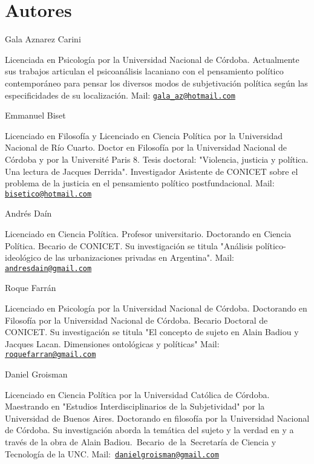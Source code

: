 \documentclass{book}
\begin{document}
\chapter*{Autores}

Gala Aznarez Carini

Licenciada en Psicología por la Universidad Nacional de Córdoba.
Actualmente sus trabajos articulan el psicoanálisis lacaniano con el
pensamiento político contemporáneo para pensar los diversos modos de
subjetivación política según las especificidades de su localización.
Mail:
\href{mailto:gala_az@hotmail.com}{\nolinkurl{gala\_az@hotmail.com}}

Emmanuel Biset

Licenciado en Filosofía y Licenciado en Ciencia Política por la
Universidad Nacional de Río Cuarto. Doctor en Filosofía por la
Universidad Nacional de Córdoba y por la Université Paris 8. Tesis
doctoral: "Violencia, justicia y política. Una lectura de Jacques
Derrida". Investigador Asistente de CONICET sobre el problema de la
justicia en el pensamiento político postfundacional. Mail:
\href{mailto:bisetico@hotmail.com}{\nolinkurl{bisetico@hotmail.com}}

Andrés Daín

Licenciado en Ciencia Política. Profesor universitario. Doctorando en
Ciencia Política. Becario de CONICET. Su investigación se titula
"Análisis político-ideológico de las urbanizaciones privadas en
Argentina". Mail:
\href{mailto:andresdain@gmail.com}{\nolinkurl{andresdain@gmail.com}}

Roque Farrán

Licenciado en Psicología por la Universidad Nacional de Córdoba.
Doctorando en Filosofía por la Universidad Nacional de Córdoba. Becario
Doctoral de CONICET. Su investigación se titula "El concepto de sujeto
en Alain Badiou y Jacques Lacan. Dimensiones ontológicas y políticas"
Mail:
\href{mailto:roquefarran@gmail.com}{\nolinkurl{roquefarran@gmail.com}}

Daniel Groisman

Licenciado en Ciencia Política por la Universidad Católica de Córdoba.
Maestrando en "Estudios Interdisciplinarios de la Subjetividad" por la
Universidad de Buenos Aires. Doctorando en filosofía por la Universidad
Nacional de Córdoba. Su investigación aborda la temática del sujeto y la
verdad en y a través de la obra de Alain Badiou.~Becario~de
la~Secretaría de Ciencia y Tecnología de la UNC.
Mail:~\href{mailto:danielgroisman@gmail.com}{\nolinkurl{danielgroisman@gmail.com}}
\end{document}
